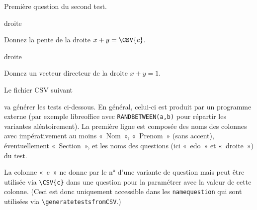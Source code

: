 \documentclass[12pt,a4paper, rulers%
]{tests}
\begin{document}
\begin{question}
  Première question du second test.
\end{question}


\begin{namequestion}{droite}
  \begin{question}
    Donnez la pente de la droite $x + y = \CSV{c}$.
  \end{question}
\end{namequestion}
\begin{namequestion}{droite}
  \begin{question}
    Donnez un vecteur directeur de la droite $x + y = 1$.    
  \end{question}
\end{namequestion}

\newpage
Le fichier CSV suivant

va générer les tests ci-dessous.  En général, celui-ci est produit
par un programme externe (par exemple libreoffice avec
\verb+RANDBETWEEN(a,b)+ pour répartir les variantes aléatoirement).
La première ligne est composée des noms des
colonnes avec impérativement au moins «~Nom~», «~Prenom~» (sans
accent), éventuellement «~Section~», et les noms des questions (ici
«~edo~» et «~droite~») du test.

La colonne «~c~» ne donne par le n° d'une variante de question mais
peut être utilisée via \verb+\CSV{c}+ dans une question pour la
paramétrer avec la valeur de cette colonne.  (Ceci est donc uniquement
accessible dans les \verb+namequestion+ qui sont utilisées via
\verb+\generatetestsfromCSV+.)

\end{document}
